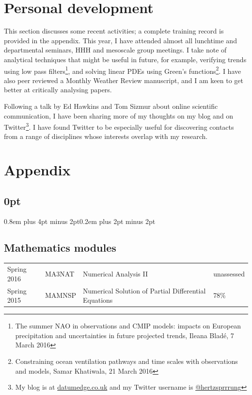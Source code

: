 \documentclass[a4paper,11pt]{article}
\begin{document}
\section{Personal development}
This section discusses some recent activities; a complete training record is provided in the appendix.
This year, I have attended almost all lunchtime and departmental seminars, HHH and mesoscale group meetings.  I take note of analytical techniques that might be useful in future, for example, verifying trends using low pass filters\footnote{The summer NAO in observations and CMIP models: impacts on European precipitation and uncertainties in future projected trends, Ileana Bladé, 7 March 2016}, and solving linear PDEs using Green's functions\footnote{Constraining ocean ventilation pathways and time scales with observations and models, Samar Khatiwala, 21 March 2016}.
I have also peer reviewed a Monthly Weather Review manuscript, and I am keen to get better at critically analysing papers.

Following a talk by Ed Hawkins and Tom Sizmur about online scientific communication, I have been sharing more of my thoughts on my blog and on Twitter\footnote{My blog is at \url{datumedge.co.uk} and my Twitter username is \href{https://twitter.com/hertzsprrrung}{@hertzsprrrung}}.  I have found Twitter to be especially useful for discovering contacts from a range of disciplines whose interests overlap with my research.


                                                 


\newpage

\section*{Appendix}

\titlespacing\subsection{0pt}{0.8em plus 4pt minus 2pt}{0.2em plus 2pt minus 2pt}

\subsection*{Mathematics modules}
\footnotesize
\begin{tabular}{l l l l}
Spring 2016	& MA3NAT & Numerical Analysis II & unassessed \\
Spring 2015	& MAMNSP & Numerical Solution of Partial Differential Equations  & 78\% \\
\end{tabular}
\end{document}
